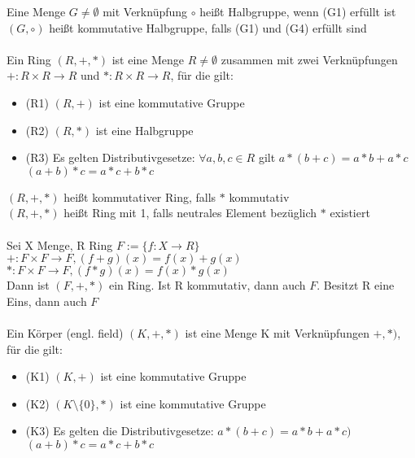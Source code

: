 \documentclass{article}
\begin{document}
	Eine Menge $G \neq \emptyset$ mit Verknüpfung $\circ$ heißt Halbgruppe, wenn (G1) erfüllt ist\\
	$(G, \circ)$ heißt kommutative Halbgruppe, falls (G1) und (G4) erfüllt sind\\\\
	Ein Ring $(R, +, *)$ ist eine Menge $R \neq \emptyset$ zusammen mit zwei Verknüpfungen $+: R \times R \to R$ und $*: R \times R \to R$, für die gilt:
	\begin{itemize}
	\item (R1) $(R, +)$ ist eine kommutative Gruppe
	\item (R2) $(R, *)$ ist eine Halbgruppe
	\item (R3) Es gelten Distributivgesetze: $\forall a,b,c \in R$ gilt 
	\tabto{2cm} $a * (b+c) = a*b + a*c$ \\
	\tabto{2cm} $(a+b)*c = a*c + b*c$
	\end{itemize}
	$(R, +, *)$ heißt kommutativer Ring, falls $*$ kommutativ\\
	$(R, +, *)$ heißt Ring mit 1, falls neutrales Element bezüglich $*$ existiert\\\\
	Sei X Menge, R Ring
	\tabto{2cm} $F:= \{f: X \to R\}$\\
	\tabto{2cm} $+: F \times F \to F, (f+g)(x) = f(x) + g(x)$\\
	\tabto{2cm} $*: F \times F \to F, (f*g)(x) = f(x) * g(x)$\\
	Dann ist $(F, +, *)$ ein Ring. Ist R kommutativ, dann auch $F$. Besitzt R eine Eins, dann auch $F$\\\\
	Ein Körper (engl. field) $(K, +, *)$ ist eine Menge K mit Verknüpfungen $+, *)$, für die gilt:
	\begin{itemize}
	\item (K1) $(K, +)$ ist eine kommutative Gruppe\\
	\item (K2) $(K \setminus \{0\}, *)$ ist eine kommutative Gruppe\\
	\item (K3) Es gelten die Distributivgesetze: \tabto{6.5cm} $a * (b + c) = a*b + a*c)$\\
	\tabto{6.5cm} $(a + b) * c = a * c + b * c$
	\end{itemize}
\end{document}
